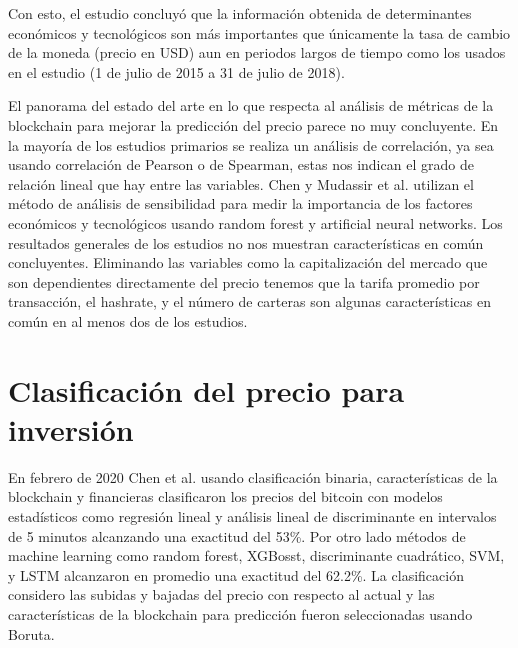 
Con esto, el estudio concluyó que la información obtenida de determinantes económicos y tecnológicos son más importantes que únicamente la tasa de cambio de la moneda (precio en USD) aun en periodos largos de tiempo como los usados en el estudio (1 de julio de 2015 a 31 de julio de 2018). 

El panorama del estado del arte en lo que respecta al análisis de métricas de la blockchain para mejorar la predicción del precio parece no muy concluyente. En la mayoría de los estudios primarios se realiza un análisis de correlación, ya sea usando correlación de Pearson o de Spearman, estas nos indican el grado de relación lineal que hay entre las variables. Chen y Mudassir et al. \cite{chenMachineLearningModel2021, mudassirTimeseriesForecastingBitcoin2020} utilizan el método de análisis de sensibilidad para medir la importancia de los factores económicos y tecnológicos usando random forest y artificial neural networks. Los resultados generales de los estudios no nos muestran características en común concluyentes. Eliminando las variables como la capitalización del mercado que son dependientes directamente del precio tenemos que la tarifa promedio por transacción, el hashrate, y el número de carteras son algunas características en común en al menos dos de los estudios.



\section{Clasificación del precio para inversión}
 
 
En febrero de 2020 Chen et al. \cite{chenBitcoinPricePrediction2020} usando clasificación binaria, características de la blockchain y financieras clasificaron los precios del bitcoin con modelos estadísticos como regresión lineal y análisis lineal de discriminante en intervalos de 5 minutos alcanzando una exactitud del 53\%. Por otro lado métodos de machine learning como random forest, XGBosst, discriminante cuadrático, SVM, y LSTM alcanzaron en promedio una exactitud del 62.2\%.
La clasificación considero las subidas y bajadas del precio con respecto al actual y las características de la blockchain para predicción fueron seleccionadas usando Boruta. 

